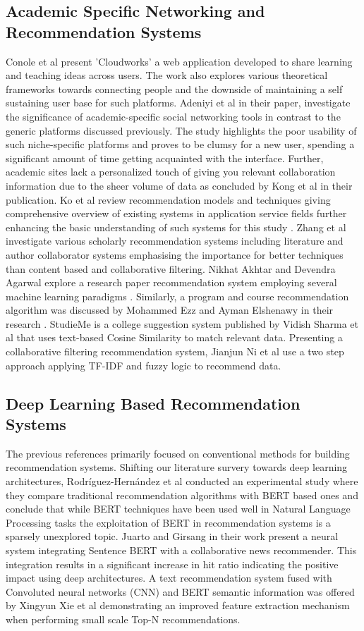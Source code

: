 \subsection{Academic Specific Networking and Recommendation Systems} Conole et al \cite{ref13} present 'Cloudworks' a web application developed to share learning and teaching ideas across users. The work also explores various theoretical frameworks towards connecting people and the downside of maintaining a self sustaining user base for such platforms. 
Adeniyi et al \cite{ref3} in their paper, investigate the significance of academic-specific social networking tools in contrast to the generic platforms discussed previously. The study highlights the poor usability of such niche-specific platforms and proves to be clumsy for a new user, spending a significant amount of time getting acquainted with the interface. Further, academic sites lack a personalized touch of giving you relevant collaboration information due to the sheer volume of data as concluded by Kong et al \cite{ref4} in their publication. Ko et al \cite{ref16} review recommendation models and techniques giving comprehensive overview of existing systems in application service fields further enhancing the basic understanding of such systems for this study . Zhang et al \cite{ref6} investigate various scholarly recommendation systems including literature and author collaborator systems emphasising the importance for better techniques than content based and collaborative filtering. Nikhat Akhtar and Devendra Agarwal \cite{ref7} explore a research paper recommendation system employing several machine learning paradigms . Similarly, a program and course recommendation algorithm was discussed by Mohammed Ezz and Ayman Elshenawy \cite{ref8} in their research . StudieMe is a college suggestion system published by Vidish Sharma et al \cite{ref9} that uses text-based Cosine Similarity to match relevant data. Presenting a collaborative filtering recommendation system, Jianjun Ni et al \cite{ref15} use a two step approach applying TF-IDF and fuzzy logic to recommend data. 

\subsection{Deep Learning Based Recommendation Systems} The previous references primarily focused on conventional methods for building recommendation systems. Shifting our literature survery towards deep learning architectures, Rodríguez-Hernández et al \cite{ref17} conducted an experimental study where they compare traditional recommendation algorithms with BERT based ones and conclude that while BERT techniques have been used well in Natural Language Processing tasks the exploitation of BERT in recommendation systems is a sparsely unexplored topic. Juarto and Girsang \cite{ref19} in their work present a neural system integrating Sentence BERT with a collaborative news recommender. This integration results in a significant increase in hit ratio indicating the positive impact using deep architectures. A text recommendation system fused with Convoluted neural networks (CNN) and BERT semantic information was offered by Xingyun Xie et al \cite{ref20} demonstrating an improved feature extraction mechanism when performing small scale Top-N recommendations.